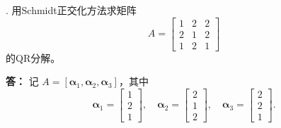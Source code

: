 \documentclass{article}
\begin{document}
. 用Schmidt正交化方法求矩阵
\[
A=\begin{bmatrix}
1 & 2 & 2 \\
2 & 1 & 2 \\
1 & 2 & 1
\end{bmatrix}
\]
的QR分解。

\noindent \textbf{答：}
记 $A=[\bm{\alpha}_1,\bm{\alpha}_2,\bm{\alpha}_3]$，其中
\[
\bm{\alpha}_1=\begin{bmatrix}1\\2\\1\end{bmatrix},\quad
\bm{\alpha}_2=\begin{bmatrix}2\\1\\2\end{bmatrix},\quad
\bm{\alpha}_3=\begin{bmatrix}2\\2\\1\end{bmatrix}.
\]
\end{document}
